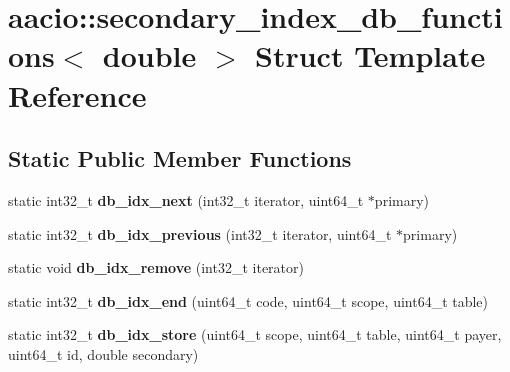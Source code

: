 \hypertarget{structaacio_1_1secondary__index__db__functions_3_01double_01_4}{}\section{aacio\+:\+:secondary\+\_\+index\+\_\+db\+\_\+functions$<$ double $>$ Struct Template Reference}
\label{structaacio_1_1secondary__index__db__functions_3_01double_01_4}
\subsection*{Static Public Member Functions}
\begin{DoxyCompactItemize}
\item 
\mbox{\label{structaacio_1_1secondary__index__db__functions_3_01double_01_4_ae436514f6aca1efc486da67f9fc5e132}} 
static int32\+\_\+t {\bfseries db\+\_\+idx\+\_\+next} (int32\+\_\+t iterator, uint64\+\_\+t $\ast$primary)
\item 
\mbox{\label{structaacio_1_1secondary__index__db__functions_3_01double_01_4_ae8bbea0a684e1ee9b6b033a92e7a2395}} 
static int32\+\_\+t {\bfseries db\+\_\+idx\+\_\+previous} (int32\+\_\+t iterator, uint64\+\_\+t $\ast$primary)
\item 
\mbox{\label{structaacio_1_1secondary__index__db__functions_3_01double_01_4_aa79d1d30f0cd3f358c7c83884b38dd06}} 
static void {\bfseries db\+\_\+idx\+\_\+remove} (int32\+\_\+t iterator)
\item 
\mbox{\label{structaacio_1_1secondary__index__db__functions_3_01double_01_4_a346a9100b9cf2521dae41f93ae3ed830}} 
static int32\+\_\+t {\bfseries db\+\_\+idx\+\_\+end} (uint64\+\_\+t code, uint64\+\_\+t scope, uint64\+\_\+t table)
\item 
\mbox{\label{structaacio_1_1secondary__index__db__functions_3_01double_01_4_abcf09acf91485093c9461d505ae724af}} 
static int32\+\_\+t {\bfseries db\+\_\+idx\+\_\+store} (uint64\+\_\+t scope, uint64\+\_\+t table, uint64\+\_\+t payer, uint64\+\_\+t id, double secondary)

\end{DoxyCompactItemize}
